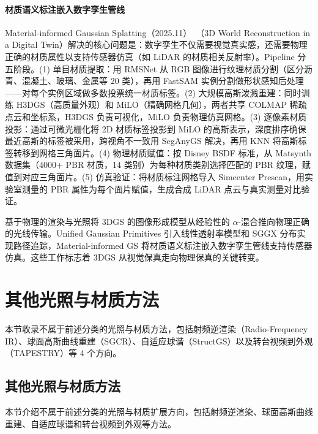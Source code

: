 \paragraph{材质语义标注嵌入数字孪生管线}

Material-informed Gaussian Splatting（2025.11）~\cite{2511_20348}（3D World Reconstruction in a Digital Twin）解决的核心问题是：数字孪生不仅需要视觉真实感，还需要物理正确的材质属性以支持传感器仿真（如 LiDAR 的材质相关反射率）。Pipeline 分五阶段。(1) 单目材质提取：用 RMSNet 从 RGB 图像进行纹理材质分割（区分沥青、混凝土、玻璃、金属等 20 类），再用 FastSAM 实例分割做形状感知后处理——对每个实例区域做多数投票统一材质标签。(2) 大规模高斯泼溅重建：同时训练 H3DGS（高质量外观）和 MiLO（精确网格几何），两者共享 COLMAP 稀疏点云和坐标系，H3DGS 负责可视化，MiLO 负责物理仿真网格。(3) 逐像素材质投影：通过可微光栅化将 2D 材质标签投影到 MiLO 的高斯表示，深度排序确保最近高斯的标签被采用，跨视角不一致用 SegAnyGS 解决，再用 KNN 将高斯标签转移到网格三角面片。(4) 物理材质赋值：按 Disney BSDF 标准，从 Matsynth 数据集（4000+ PBR 材质，14 类别）为每种材质类别选择匹配的 PBR 纹理，赋值到对应三角面片。(5) 仿真验证：将材质标注网格导入 Simcenter Prescan，用实验室测量的 PBR 属性为每个面片赋值，生成合成 LiDAR 点云与真实测量对比验证。

\begin{takeaway}
基于物理的渲染与光照将 3DGS 的图像形成模型从经验性的 $\alpha$-混合推向物理正确的光线传输。Unified Gaussian Primitives 引入线性透射率模型和 SGGX 分布实现路径追踪，Material-informed GS 将材质语义标注嵌入数字孪生管线支持传感器仿真。这些工作标志着 3DGS 从视觉保真走向物理保真的关键转变。
\end{takeaway}

\section{其他光照与材质方法}
\label{sec:05_6}

本节收录不属于前述分类的光照与材质方法，包括射频逆渲染（Radio-Frequency IR）、球面高斯曲线重建（SGCR）、自适应球谐（StructGS）以及转台视频到外观（TAPESTRY）等 4 个方向。

\subsection{其他光照与材质方法}
\label{ss:05_6a}

本节介绍不属于前述分类的光照与材质扩展方向，包括射频逆渲染、球面高斯曲线重建、自适应球谐和转台视频到外观等方法。

